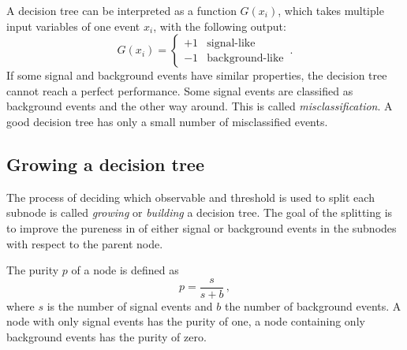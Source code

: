 A decision tree can be interpreted as a function $G(x_i)$, which takes multiple input variables of one event $x_i$, with
the following output:
\begin{equation}
    \label{eq:dt}
    G(x_i) =
    \begin{cases}
        +1 & \text{signal-like} \\
        -1 & \text{background-like}
    \end{cases} \,.
\end{equation}
If some signal and background events have similar properties, the decision tree cannot reach a perfect performance.
Some signal events are classified as background events and the other way around.
This is called \emph{misclassification}.
A good decision tree has only a small number of misclassified events.

\subsection{Growing a decision tree}\label{sub:bdt:dt:growing}

The process of deciding which observable and threshold is used to split each subnode
is called \emph{growing} or \emph{building} a decision tree.
The goal of the splitting is to improve the pureness in of either signal or background events in the subnodes with respect to the parent node.

The purity $p$ of a node is defined as
\begin{equation}
    \label{eq:purity}
    p = \frac{s}{s+b}\,,
\end{equation}
where $s$ is the number of signal events and $b$ the number of background events.
A node with only signal events has the purity of one, a node containing only background events has the purity of zero.

